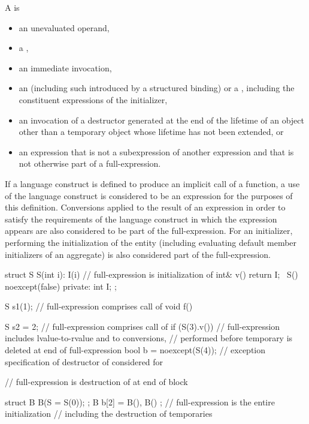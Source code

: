 \pnum
A  is
\begin{itemize}
\item
an unevaluated operand,
\item
a ,
\item
an immediate invocation,
\item
an 
(including such introduced by a structured binding) or
a ,
including the constituent expressions of the initializer,
\item
an invocation of a destructor generated at the end of the lifetime
of an object other than a temporary object
whose lifetime has not been extended, or
\item
an expression that is not a subexpression of another expression and
that is not otherwise part of a full-expression.
\end{itemize}
If a language construct is defined to produce an implicit call of a function,
a use of the language construct is considered to be an expression
for the purposes of this definition.
Conversions applied to the result of an expression in order to satisfy the requirements
of the language construct in which the expression appears
are also considered to be part of the full-expression.
For an initializer, performing the initialization of the entity
(including evaluating default member initializers of an aggregate)
is also considered part of the full-expression.
\begin{example}
\begin{codeblock}
struct S {
  S(int i): I(i) { }            // full-expression is initialization of 
  int& v() { return I; }
  ~S() noexcept(false) { }
private:
  int I;
};

S s1(1);                        // full-expression comprises call of 
void f() {
  S s2 = 2;                     // full-expression comprises call of 
  if (S(3).v())                 // full-expression includes lvalue-to-rvalue and  to  conversions,
                                // performed before temporary is deleted at end of full-expression
  { }
  bool b = noexcept(S(4));      // exception specification of destructor of  considered for 

  // full-expression is destruction of  at end of block
}
struct B {
  B(S = S(0));
};
B b[2] = { B(), B() };          // full-expression is the entire initialization
                                // including the destruction of temporaries
\end{codeblock}
\end{example}


